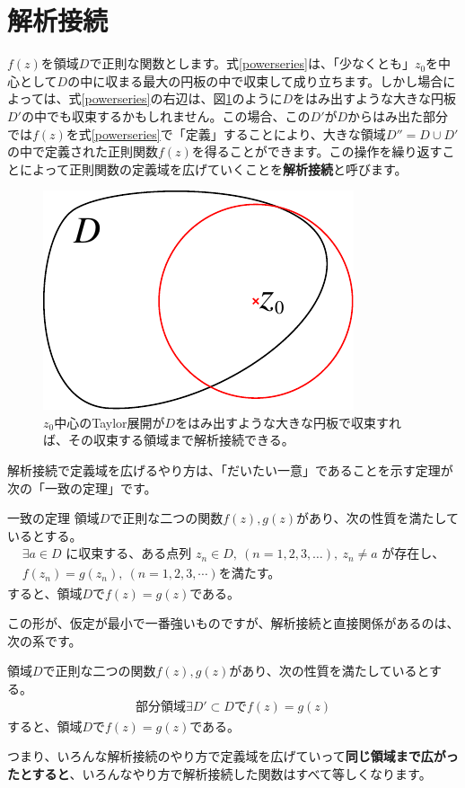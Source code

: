 \documentclass[report,paper=a4, fontsize=12pt, line_length=16cm, number_of_lines=33,dvipdfmx]{jlreq}
\numberwithin{equation}{section}
\newcommand{\strong}[1]{\textsf{\bfseries #1}}
\begin{document}
\section{解析接続}
$f(z)$を領域$D$で正則な関数とします。式\eqref{powerseries}は、「少なくとも」$z_0$を中心として$D$の中に収まる最大の円板の中で収束して成り立ちます。しかし場合によっては、式\eqref{powerseries}の右辺は、図\ref{fig:largerdisk}のように$D$をはみ出すような大きな円板$D'$の中でも収束するかもしれません。この場合、この$D'$が$D$からはみ出た部分では$f(z)$を式\eqref{powerseries}で「定義」することにより、大きな領域$D''=D\cup D'$の中で定義された正則関数$f(z)$を得ることができます。この操作を繰り返すことによって正則関数の定義域を広げていくことを\strong{解析接続}と呼びます。
\begin{figure}[htbp]
  \centering
  \includegraphics{largerdisk.pdf}
  \caption{$z_0$中心のTaylor展開が$D$をはみ出すような大きな円板で収束すれば、その収束する領域まで解析接続できる。}
  \label{fig:largerdisk}
\end{figure}


解析接続で定義域を広げるやり方は、「だいたい一意」であることを示す定理が次の「一致の定理」です。
\begin{theor}{一致の定理}{}
  領域$D$で正則な二つの関数$f(z),g(z)$があり、次の性質を満たしているとする。
  \begin{align*}
    \exists a \in D \text{ に収束する、ある点列 }z_n\in D,\ (n=1,2,3,\dots),\ z_n\ne a\text{ が存在し、}\nonumber\\
    f(z_n)=g(z_n),\ (n=1,2,3,\cdots)\text{を満たす。}
  \end{align*}
  すると、領域$D$で$f(z)=g(z)$である。
\end{theor}
この形が、仮定が最小で一番強いものですが、解析接続と直接関係があるのは、次の系です。
\begin{col}{}{}
  領域$D$で正則な二つの関数$f(z),g(z)$があり、次の性質を満たしているとする。
  \begin{align*}
    部分領域\exists D'\subset Dで f(z)=g(z)
  \end{align*}
  すると、領域$D$で$f(z)=g(z)$である。
\end{col}
つまり、いろんな解析接続のやり方で定義域を広げていって\strong{同じ領域まで広がったとすると}、いろんなやり方で解析接続した関数はすべて等しくなります。
\end{document}
